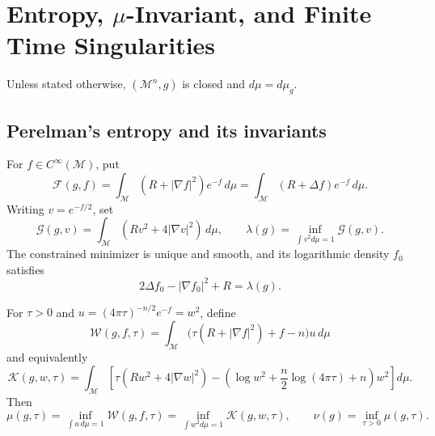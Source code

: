 \chapter[17]{Entropy, \texorpdfstring{$\mu$}{mu}-Invariant, and Finite Time Singularities}
\label{ch:chow-iii-entropy-mu-finite-time-singularities}

Unless stated otherwise, \((\mathcal M^n,g)\) is closed and
\(d\mu=d\mu_g\).

\section{Perelman's entropy and its invariants}

\begin{definition}
\label{def:chow-iii-ch17-perelman-energy-lambda}
For $f\in C^\infty(\mathcal M)$, put
\[
 \mathcal F(g,f)=\int_{\mathcal M}(R+|\nabla f|^2)e^{-f}\,d\mu
 =\int_{\mathcal M}(R+\Delta f)e^{-f}\,d\mu.
\]
Writing $v=e^{-f/2}$, set
\[
 \mathcal G(g,v)=\int_{\mathcal M}(Rv^2+4|\nabla v|^2)\,d\mu,
 \qquad
 \lambda(g)=\inf_{\int v^2d\mu=1}\mathcal G(g,v).
\]
The constrained minimizer is unique and smooth, and its logarithmic density
$f_0$ satisfies
\[
 2\Delta f_0-|\nabla f_0|^2+R=\lambda(g).
\]
\end{definition}

\begin{definition}
\label{def:chow-iii-ch17-perelman-entropy-mu-nu}
For $\tau>0$ and
$u=(4\pi\tau)^{-n/2}e^{-f}=w^2$, define
\[
 \mathcal W(g,f,\tau)=\int_{\mathcal M}
 \bigl(\tau(R+|\nabla f|^2)+f-n\bigr)u\,d\mu
\]
and equivalently
\[
 \mathcal K(g,w,\tau)=\int_{\mathcal M}
 \left[\tau(Rw^2+4|\nabla w|^2)
 -\left(\log w^2+\frac n2\log(4\pi\tau)+n\right)w^2\right]d\mu.
\]
Then
\[
 \mu(g,\tau)=\inf_{\int u\,d\mu=1}\mathcal W(g,f,\tau)
 =\inf_{\int w^2d\mu=1}\mathcal K(g,w,\tau),
 \qquad \nu(g)=\inf_{\tau>0}\mu(g,\tau).
\]
\end{definition}

